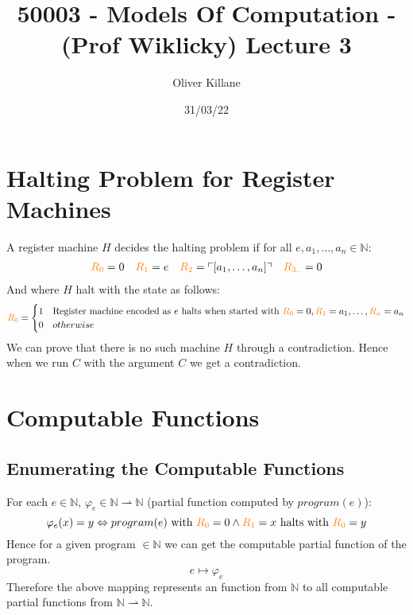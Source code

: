 \documentclass{report}
\title{50003 - Models Of Computation - (Prof Wiklicky) Lecture 3}
\author{Oliver Killane}
\date{31/03/22}
\begin{document}
    \maketitle

    \section*{Halting Problem for Register Machines}
        A register machine $H$ decides the halting problem if for all $e, a_1, \dots, a_n \in \mathbb{N}$:
        \[\begin{matrix}
            \text{\textcolor{orange}{$R_{0}$}} = 0 & \text{\textcolor{orange}{$R_{1}$}} = e & \text{\textcolor{orange}{$R_{2}$}} = \ulcorner [a_1, \dots, a_n]\urcorner & \text{\textcolor{orange}{$R_{3..}$}} = 0 \\
        \end{matrix}\]
        And where $H$ halt with the state as follows:
        \[\text{\textcolor{orange}{$R_{0}$}} = \begin{cases}
            1 & \text{Register machine encoded as $e$ halts when started with $\text{\textcolor{orange}{$R_{0}$}} = 0, \text{\textcolor{orange}{$R_{1}$}} = a_1, \dots, \text{\textcolor{orange}{$R_{n}$}} = a_n$} \\
            0 & otherwise \\
        \end{cases}\]
        We can prove that there is no such machine $H$ through a contradiction.
        Hence when we run $C$ with the argument $C$ we get a contradiction.
    \section*{Computable Functions}
        \subsection*{Enumerating the Computable Functions}  
            For each $e \in \mathbb{N}$, $\varphi_e \in \mathbb{N} \rightharpoonup \mathbb{N}$ (partial function computed by $program(e)$):
            \[\varphi_e(x) = y \Leftrightarrow program(e) \text{ with } \text{\textcolor{orange}{$R_{0}$}} = 0 \land \text{\textcolor{orange}{$R_{1}$}} = x \text{ halts with } \text{\textcolor{orange}{$R_{0}$}} = y\]
            Hence for a given program $\in \mathbb{N}$ we can get the computable partial function of the program.
            \[e \mapsto \varphi_e\]
            Therefore the above mapping represents an  function from $\mathbb{N}$ to all computable partial functions from $\mathbb{N} \rightharpoonup \mathbb{N}$.
\end{document}
